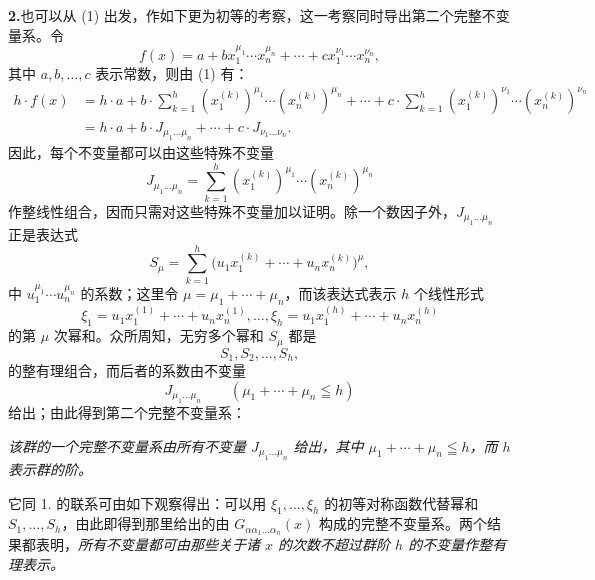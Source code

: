 \noindent\textbf{2.}\enspace 也可以从 (1) 出发，作如下更为初等的考察，这一考察同时导出第二个完整不变量系。令
\[
  f(x)=a+b x_1^{\mu_1}\cdots x_n^{\mu_n}
       +\cdots+c x_1^{\nu_1}\cdots x_n^{\nu_n},
\]
其中 $a,b,\ldots,c$ 表示常数，则由 (1) 有：
\[
\begin{aligned}
 h\cdot f(x)
 &=h\cdot a+b\cdot\sum_{k=1}^{h}(x_1^{(k)})^{\mu_1}\cdots(x_n^{(k)})^{\mu_n}
     +\cdots
     +c\cdot\sum_{k=1}^{h}(x_1^{(k)})^{\nu_1}\cdots(x_n^{(k)})^{\nu_n} \\
 &=h\cdot a+b\cdot J_{\mu_1\ldots\mu_n}+\cdots+c\cdot J_{\nu_1\ldots\nu_n}.
\end{aligned}
\]
因此，每个不变量都可以由这些特殊不变量
\[
  J_{\mu_1\ldots\mu_n}
  =\sum_{k=1}^{h}(x_1^{(k)})^{\mu_1}\cdots(x_n^{(k)})^{\mu_n}
\]
作整线性组合，因而只需对这些特殊不变量加以证明。除一个数因子外，$J_{\mu_1\ldots\mu_n}$ 正是表达式
\[
  S_\mu=\sum_{k=1}^{h}
  \bigl(u_1x_1^{(k)}+\cdots+u_nx_n^{(k)}\bigr)^{\mu},
\]
中 $u_1^{\mu_1}\cdots u_n^{\mu_n}$ 的系数；这里令 $\mu=\mu_1+\cdots+\mu_n$，而该表达式表示 $h$ 个线性形式
\[
  \xi_1=u_1x_1^{(1)}+\cdots+u_nx_n^{(1)},\ldots,
  \xi_h=u_1x_1^{(h)}+\cdots+u_nx_n^{(h)}
\]
的第 $\mu$ 次幂和。众所周知，无穷多个幂和 $S_\mu$ 都是
\[
  S_1,S_2,\ldots,S_h,
\]
的整有理组合，而后者的系数由不变量
\[
  J_{\mu_1\ldots\mu_n}\qquad(\mu_1+\cdots+\mu_n\leqq h)
\]
给出；由此得到第二个完整不变量系：

\emph{该群的一个完整不变量系由所有不变量 $J_{\mu_1\ldots\mu_n}$ 给出，其中 $\mu_1+\cdots+\mu_n\leqq h$，而 $h$ 表示群的阶。}

它同 1. 的联系可由如下观察得出：可以用 $\xi_1,\ldots,\xi_h$ 的初等对称函数代替幂和 $S_1,\ldots,S_h$，由此即得到那里给出的由 $G_{\alpha\alpha_1\ldots\alpha_n}(x)$ 构成的完整不变量系。两个结果都表明，\emph{所有不变量都可由那些关于诸 $x$ 的次数不超过群阶 $h$ 的不变量作整有理表示。}


